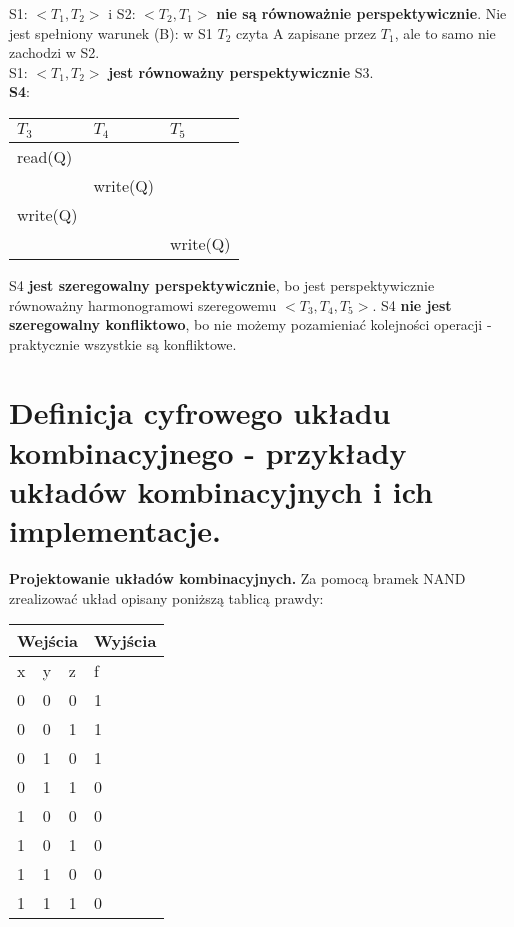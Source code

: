 \documentclass[main.tex]{subfiles}
\begin{document}
    S1: $<T_1, T_2>$ i S2: $<T_2, T_1>$ \textbf{nie są równoważnie perspektywicznie}. Nie jest spełniony warunek (B):
    w S1 $T_2$ czyta A zapisane przez $T_1$, ale to samo nie zachodzi w S2.\\

    S1: $<T_1, T_2>$ \textbf{jest równoważny perspektywicznie} S3.\\

    \noindent \textbf{S4}:
    \begin{table}[H]
        \begin{center}
            \begin{tabular}{| p{4cm} | p{4cm} | p{4cm} |}
                \hline
                $T_3$ & $T_4$ & $T_5$\\
                \hline
                \hline
                read(Q) &&\\
                \hline
                & write(Q) &\\
                \hline
                write(Q) &&\\
                \hline
                && write(Q)\\
                \hline
            \end{tabular}
        \end{center}
    \end{table}

    S4 \textbf{jest szeregowalny perspektywicznie}, bo jest perspektywicznie równoważny harmonogramowi szeregowemu
    $<T_3, T_4, T_5>$. S4 \textbf{nie jest szeregowalny konfliktowo}, bo nie możemy pozamieniać kolejności operacji
    - praktycznie wszystkie są konfliktowe.

    \newpage

    \section{Definicja cyfrowego układu kombinacyjnego - przykłady układów kombinacyjnych i ich implementacje.}

    \begin{exercise}
        \textbf{Projektowanie układów kombinacyjnych.} Za pomocą bramek NAND zrealizować układ opisany poniższą tablicą
        prawdy:

        \begin{tabular}{| p{1cm} p{1cm} p{1cm} | p{2cm} |}
            \hline
            \multicolumn{3}{|c|}{Wejścia} & Wyjścia\\
            \hline
            x & y & z & f\\
            \hline
            0 & 0 & 0 & 1\\
            0 & 0 & 1 & 1\\
            0 & 1 & 0 & 1\\
            0 & 1 & 1 & 0\\
            1 & 0 & 0 & 0\\
            1 & 0 & 1 & 0\\
            1 & 1 & 0 & 0\\
            1 & 1 & 1 & 0\\
            \hline
        \end{tabular}
    \end{exercise}
\end{document}
